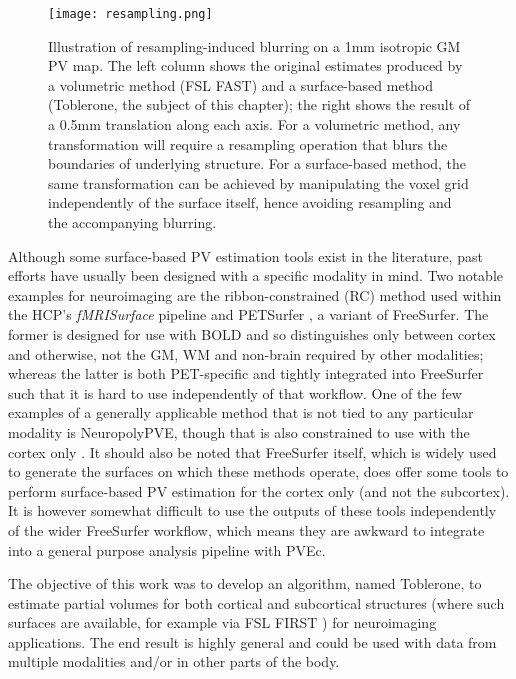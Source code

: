 \begin{figure}
\centering
\texttt{[image: resampling.png]}
\caption{Illustration of resampling-induced blurring on a 1mm isotropic GM PV map. The left column shows the original estimates produced by a volumetric method (FSL FAST) and a surface-based method (Toblerone, the subject of this chapter); the right shows the result of a 0.5mm translation along each axis. For a volumetric method, any transformation will require a resampling operation that blurs the boundaries of underlying structure. For a surface-based method, the same transformation can be achieved by manipulating the voxel grid independently of the surface itself, hence avoiding resampling and the accompanying blurring.}
\label{resampling_demo}
\end{figure}

Although some surface-based PV estimation tools exist in the literature, past efforts have usually been designed with a specific modality in mind. Two notable examples for neuroimaging are the ribbon-constrained (RC) method used within the HCP's \textit{fMRISurface} pipeline \cite{Glasser2013} and PETSurfer \cite{Greve2016, Greve2014}, a variant of FreeSurfer. The former is designed for use with BOLD and so distinguishes only between cortex and otherwise, not the GM, WM and non-brain required by other modalities; whereas the latter is both PET-specific and tightly integrated into FreeSurfer such that it is hard to use independently of that workflow. One of the few examples of a generally applicable method that is not tied to any particular modality is NeuropolyPVE, though that is also constrained to use with the cortex only \cite{NeuropolyPVE}. It should also be noted that FreeSurfer itself, which is widely used to generate the surfaces on which these methods operate, does offer some tools to perform surface-based PV estimation for the cortex only (and not the subcortex). It is however somewhat difficult to use the outputs of these tools independently of the wider FreeSurfer workflow, which means they are awkward to integrate into a general purpose analysis pipeline with PVEc. 

The objective of this work was to develop an algorithm, named Toblerone, to estimate partial volumes for both cortical and subcortical structures (where such surfaces are available, for example via FSL FIRST \cite{Patenaude2011}) for neuroimaging applications. The end result is highly general and could be used with data from multiple modalities and/or in other parts of the body. 

